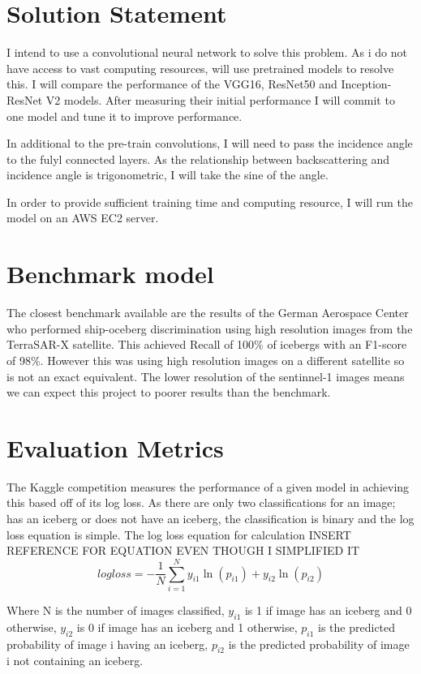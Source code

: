\documentclass{article}
\begin{document}
\section{Solution Statement}
I intend to use a convolutional neural network to solve this problem. As i do not have access to vast computing resources, will use pretrained models to resolve this. I will compare the performance of the VGG16, ResNet50 and Inception-ResNet V2 models. After measuring their initial performance I will commit to one model and tune it to improve performance. 

In additional to the pre-train convolutions, I will need to pass the incidence angle to the fulyl connected layers. As the relationship between backscattering and incidence angle is trigonometric, I will take the sine of the angle. 

In order to provide sufficient training time and computing resource, I will run the model on an AWS EC2 server. 

\section{Benchmark model}
The closest benchmark available are the results of the German Aerospace Center \cite{bentes} who performed ship-oceberg discrimination using high resolution images from the TerraSAR-X satellite. This achieved Recall of 100\% of icebergs with an F1-score of 98\%. However this was using high resolution images on a different satellite so is not an exact equivalent. The lower resolution of the sentinnel-1 images means we can expect this project to poorer results than the benchmark. 

\section{Evaluation Metrics}
The Kaggle competition measures the performance of a given model in achieving this based off of its log loss. As there are only two classifications for an image; has an iceberg or does not have an iceberg, the classification is binary and the log loss equation is simple. The log loss equation for calculation 
INSERT REFERENCE FOR EQUATION EVEN THOUGH I SIMPLIFIED IT
\[ logloss = - \frac{1}{N} \sum_{i=1}^{N} y_{i1}\ln(p_{i1}) + y_{i2}\ln(p_{i2}) \]

Where N is the number of images classified, $y_{i1}$ is 1 if image has an iceberg and 0 otherwise, $y_{i2}$ is 0 if image has an iceberg and 1 otherwise, $p_{i1}$ is the predicted probability of image i having an iceberg, $p_{i2}$ is the predicted probability  of image i not containing an iceberg. 
\end{document}
